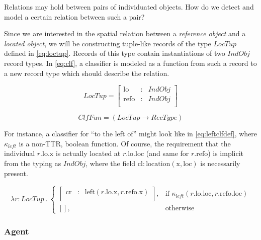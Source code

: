 \documentclass[11pt, a4paper]{article}
\begin{document}
Relations may hold between pairs of individuated objects.
How do we detect and model a certain relation between such a pair?

Since we are interested in the spatial relation between a \textit{reference object} and a \textit{located object}, we will be constructing tuple-like records of the type $LocTup$ defined in \autoref{eq:loctup}.
Records of this type contain instantiations of two $IndObj$ record types.
In \autoref{eq:clf}, a classifier is modeled as a function from such a record to a new record type which should describe the relation.

\begin{equation}\label{eq:loctup}
LocTup = \left[\begin{array}{rcl}
    \text{lo} &:& IndObj \\
    \text{refo} &:& IndObj \\
    \end{array}\right]
\end{equation}

\begin{equation}\label{eq:clf}
ClfFun = ( LocTup \rightarrow RecType )
\end{equation}

For instance, a classifier for ``to the left of'' might look like in \autoref{eq:leftclfdef}, where $\kappa_{left}$ is a non-TTR, boolean function.
Of course, the requirement that the individual $r.\text{lo}.\text{x}$ is actually located at $r.\text{lo}.\text{loc}$ (and same for $r.\text{refo}$) is implicit from the typing as $IndObj$, where the field $\text{cl} : \text{location}(\text{x}, \text{loc})$ is necessarily present.

\begin{equation}\label{eq:leftclfdef}
\lambda r : LocTup \ .\ 
\begin{cases}
\left[\begin{array}{rcl}
    \text{cr} &:& \text{left}(r.\text{lo}.\text{x}, r.\text{refo}.\text{x}) \\
\end{array}\right],
& \text{if } \kappa_{left}(r.\text{lo}.\text{loc}, r.\text{refo}.\text{loc}) \\
[], & \text{otherwise}
\end{cases}
\end{equation}



\subsubsection{Agent}
\end{document}
